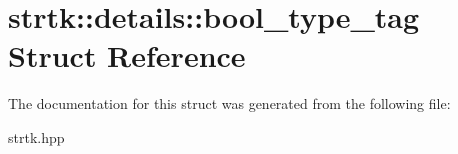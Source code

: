 \hypertarget{structstrtk_1_1details_1_1bool__type__tag}{\section{strtk\-:\-:details\-:\-:bool\-\_\-type\-\_\-tag Struct Reference}
\label{structstrtk_1_1details_1_1bool__type__tag}
}


The documentation for this struct was generated from the following file\-:\begin{DoxyCompactItemize}
\item 
strtk.\-hpp\end{DoxyCompactItemize}
